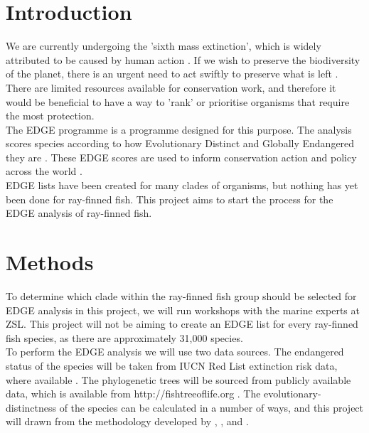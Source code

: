 \documentclass[11pt]{article}
\begin{document}
	\section{Introduction}
	\noindent
	
We are currently undergoing the 'sixth mass extinction', which is widely attributed to be caused by human action \autocite{Barnosky2011a}. If we wish to preserve the biodiversity of the planet, there is an urgent need to act swiftly to preserve what is left \autocite{Barnosky2011a}. There are limited resources available for conservation work, and therefore it would be beneficial to have a way to 'rank' or prioritise organisms that require the most protection. \\

The EDGE programme is a programme designed for this purpose. The analysis scores species according to how Evolutionary Distinct and Globally Endangered they are \autocite{Isaac2007a}. These EDGE scores are used to inform conservation action and policy across the world \autocite{Isaac2007a}. \\

EDGE lists have been created for many clades of organisms, but nothing has yet been done for ray-finned fish. This project aims to start the process for the EDGE analysis of ray-finned fish. 

	\section{Methods}
	\noindent
	
To determine which clade within the ray-finned fish group should be selected for EDGE analysis in this project, we will run workshops with the marine experts at ZSL. This project will not be aiming to create an EDGE list for every ray-finned fish species, as there are approximately 31,000 species. \\

To perform the EDGE analysis we will use two data sources. The endangered status of the species will be taken from IUCN Red List extinction risk data, where available \cite{}. The phylogenetic trees will be sourced from publicly available data, which is available from http://fishtreeoflife.org \autocite{Rabosky2018}. The evolutionary-distinctness of the species can be calculated in a number of ways, and this project will drawn from the methodology developed by \cite{Gumbs2018}, \cite{Faith2008}, and \cite{Steel2007}. \\
\end{document}

